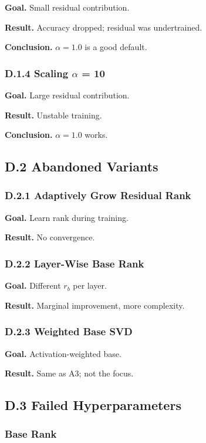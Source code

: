 \textbf{Goal.} Small residual contribution.

\textbf{Result.} Accuracy dropped; residual was undertrained.

\textbf{Conclusion.} $\alpha = 1.0$ is a good default.

\subsubsection{D.1.4 Scaling $\alpha$ = 10}

\textbf{Goal.} Large residual contribution.

\textbf{Result.} Unstable training.

\textbf{Conclusion.} $\alpha = 1.0$ works.

\subsection{D.2 Abandoned Variants}

\subsubsection{D.2.1 Adaptively Grow Residual Rank}

\textbf{Goal.} Learn rank during training.

\textbf{Result.} No convergence.

\subsubsection{D.2.2 Layer-Wise Base Rank}

\textbf{Goal.} Different $r_b$ per layer.

\textbf{Result.} Marginal improvement, more complexity.

\subsubsection{D.2.3 Weighted Base SVD}

\textbf{Goal.} Activation-weighted base.

\textbf{Result.} Same as A3; not the focus.

\subsection{D.3 Failed Hyperparameters}

\subsubsection{Base Rank}

